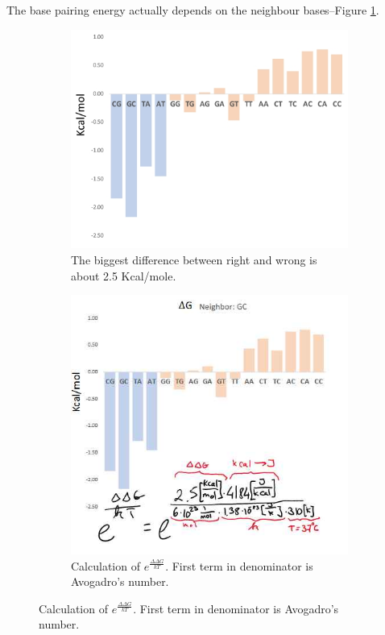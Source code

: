 \documentclass[]{article}
\begin{document}
The base pairing energy actually depends on the neighbour bases--Figure \ref{fig:BindingDifference}.
\begin{figure}[H]
	\caption{Difference in Binding Energies for different pairings}
	\begin{subfigure}[t]{0.45\textwidth}
		\caption{The biggest difference between right and wrong is about 2.5 Kcal/mole.} \label{fig:BindingDifference} 
		\includegraphics[width=\textwidth]{BindingDifference}
	\end{subfigure}
	\begin{subfigure}[t]{0.45\textwidth}
		\caption{Calculation of $e^\frac{\Delta \Delta G}{kT}$. First term in denominator is Avogadro's number.} \label{fig:BindingDifference1} 
		\includegraphics[width=\textwidth]{BindingDifference1}

\end{subfigure}
\end{figure}
\end{document}
